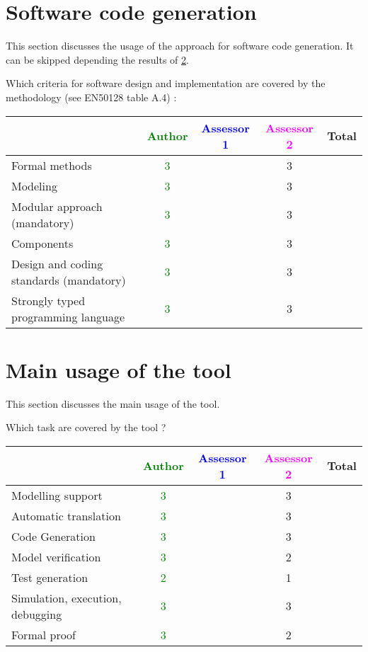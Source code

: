 \section{Software code generation}
This section discusses the usage of the approach for software code generation.
It can be skipped depending the results of \ref{main_usage}.

Which criteria for software design and implementation are covered by the methodology
(see EN50128 table A.4) :

\begin{tabular}{|l | c | c | c | c|}
\hline
& \textcolor{green}{Author} & \textcolor{blue}{Assessor 1} & \textcolor{magenta}{Assessor 2} & Total \\
\hline
Formal methods  & \textcolor{green}{3} & &3 &  \\
\hline 
Modeling  & \textcolor{green}{3} & &3 &  \\
\hline
Modular approach (mandatory) & \textcolor{green}{3} & &3 &  \\
\hline
Components & \textcolor{green}{3} & &3 &  \\
\hline
Design and coding standards (mandatory) & \textcolor{green}{3} & &3 &  \\
\hline
Strongly typed programming language & \textcolor{green}{3} & &3 &  \\
\hline

\end{tabular}



\section{Main usage of the tool}
\label{main_usage}

This section discusses the main usage of the tool.

Which task are covered by the tool ?


\begin{tabular}{|l | c | c | c | c|}
\hline
& \textcolor{green}{Author} & \textcolor{blue}{Assessor 1} & \textcolor{magenta}{Assessor 2} & Total \\
\hline 
Modelling support & \textcolor{green}{3} & &3 &  \\
\hline
Automatic translation  & \textcolor{green}{3} & &3 & \\
\hline
Code Generation  & \textcolor{green}{3} & &3 & \\
\hline
Model verification & \textcolor{green}{3} & &2 & \\
\hline
Test generation & \textcolor{green}{2} & &1 & \\
\hline
Simulation, execution, debugging & \textcolor{green}{3} & &3 & \\
\hline
Formal proof & \textcolor{green}{3} & &2 & \\
\hline
\end{tabular}

